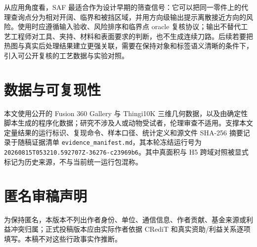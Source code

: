 从应用角度看，SAF 最适合作为设计早期的筛查信号：它可以把同一零件上的代理查询点分为相对开阔、临界和被挡区域，并用方向级输出提示离散接近方向的风险。使用时应遵循输入验收、风险排序和临界点 oracle 复核协议；输出不替代工艺工程师对工具、夹持、材料和表面要求的判断，也不生成连续刀路。后续若要把热图与真实后处理结果建立更强关联，需要在保持对象和标签语义清晰的条件下，引入可公开复核的工艺数据与实验对照。

\section*{数据与可复现性}

本文使用公开的 Fusion 360 Gallery 与 Thingi10K 三维几何数据，以及由确定性脚本生成的程序化数据；研究不涉及人或动物受试者，伦理审查不适用。支撑本文定量结果的运行标识、复现命令、样本口径、统计定义和源文件 SHA-256 摘要记录于随稿证据清单 \texttt{evidence\_manifest.md}，其本轮冻结运行号为 \texttt{20260815T053210.592707Z-36276-c23969b6}。其中真面积与 H5 跨域对照被显式标记为历史来源，不与当前统一运行包混称。

\section*{匿名审稿声明}

为保持匿名，本版本不列出作者身份、单位、通信信息、作者贡献、基金来源或利益冲突归属；正式投稿版本应由实际作者依据 CRediT 和真实资助/利益关系逐项填写。本稿不对这些行政事实作推断。
